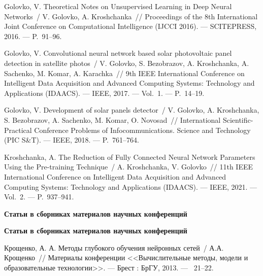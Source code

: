 Golovko, V. Theoretical Notes on Unsupervised Learning in Deep Neural Networks~/ V. Golovko, A. Kroshchanka~//
  Proceedings of the 8th International Joint Conference on Computational Intelligence (IJCCI 2016). ---
\newblock SCITEPRESS, 2016. ---
\newblock P.~91--96.

Golovko, V. Convolutional neural network based solar photovoltaic panel detection in satellite photos~/ V. Golovko, S. Bezobrazov, A. Kroshchanka, A. Sachenko, M. Komar, A. Karachka~//
  9th IEEE International Conference on Intelligent Data Acquisition and Advanced Computing Systems: Technology and Applications (IDAACS). ---
\newblock IEEE, 2017. ---
\newblock Vol.~1. ---
\newblock P.~14--19.

Golovko, V. Development of solar panels detector~/ V. Golovko, A. Kroshchanka, S. Bezobrazov, A. Sachenko, M. Komar, O. Novosad~//
  International Scientific-Practical Conference Problems of Infocommunications. Science and Technology (PIC S\&T). ---
\newblock IEEE, 2018. ---
\newblock P.~761--764.

Kroshchanka, A. The Reduction of Fully Connected Neural Network Parameters Using the Pre-training Technique~/ A. Kroshchanka, V. Golovko~//
  11th IEEE International Conference on Intelligent Data Acquisition and Advanced Computing Systems: Technology and Applications (IDAACS). ---
\newblock IEEE, 2021. ---
\newblock Vol.~2. ---
\newblock P.~937--941.

\ifx\isabstract\undefined 
\begin{center}
\vspace{3mm}
{\bf Статьи в сборниках материалов научных конференций}
\vspace{3mm}
\end{center}
\else
\vspace{2mm}
{\bf Статьи в сборниках материалов научных конференций}
\vspace{2mm}
\fi

Крощенко, А. А. Методы глубокого обучения нейронных сетей~/ А.А. Крощенко~// 
 Материалы конференции <<Вычислительные методы, модели и образовательные технологии>>. ---
\newblock Брест : БрГУ, 2013. ---
~21--22.


